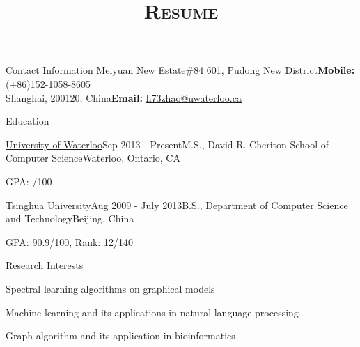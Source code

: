 \documentclass{resume} %
\title{\textsc{Resume}}
\begin{document}
\begin{rSection}{Contact Information}
Meiyuan New Estate\#84 601, Pudong New District\hfill\textbf{Mobile:} (+86)152-1058-8605\\
Shanghai, 200120, China\hfill\textbf{Email:} \href{mailto:h73zhao@uwaterloo.ca}{h73zhao@uwaterloo.ca}\\
\end{rSection}

\begin{rSection}{Education}
\begin{rSubsection}{\href{https://uwaterloo.ca/}{University of Waterloo}}{Sep 2013 - Present}{M.S., David R. Cheriton School of Computer Science}{Waterloo, Ontario, CA}
\item{GPA: /100}
\end{rSubsection}
\begin{rSubsection}{\href{http://www.tsinghua.edu.cn/publish/th/index.html}{Tsinghua University}}{Aug 2009 - July 2013}{B.S., Department of Computer Science and Technology}{Beijing, China}
\item{GPA: 90.9/100, Rank: 12/140}
\end{rSubsection}

\end{rSection}
\begin{rSection}{Research Interests}
\item{}Spectral learning algorithms on graphical models
\item{}Machine learning and its applications in natural language processing
\item{}Graph algorithm and its application in bioinformatics
\end{rSection}
\end{document}
